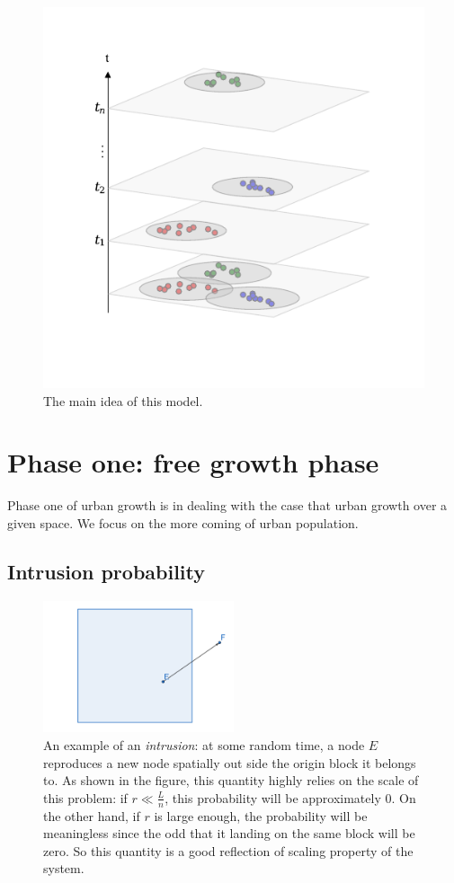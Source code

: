 \documentclass[aps,prl]{revtex4-2}
\begin{document}
\begin{figure}
	\centering
	\includegraphics[width=0.5\linewidth]{./fig/mechan.pdf}
	\caption{The main idea of this model.}
\end{figure}

\section{Phase one: free growth phase}

Phase one of urban growth is in dealing with the case that urban growth over a given space. We focus on the more coming of urban population.

\subsection{Intrusion probability}

\begin{figure}[b]
	\centering
	\includegraphics[width = 0.5\textwidth]{fig/intrusion_eg}
	\caption{An example of an \emph{intrusion}: at some random time, a node $E$ reproduces a new node spatially out side the origin block it belongs to. As shown in the figure, this quantity highly relies on the scale of this problem: if $r \ll \frac{L}{n}$, this probability will be approximately $0$. On the other hand, if $r$ is large enough, the probability will be meaningless since the odd that it landing on the same block will be zero. So this quantity is a good reflection of scaling property of the system. }\label{fig:intrusion_eg}
\end{figure}
\end{document}
